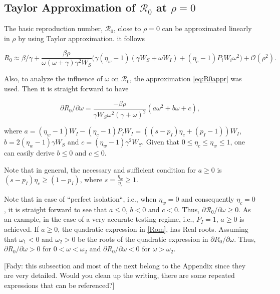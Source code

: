 \documentclass[12pt]{article}
\newcommand{\Rnum}{\mathcal{R}_0}
\theoremstyle{definition} %
\begin{document}
\subsection{Taylor Approximation of $\Rnum$ at $\rho=0$ }

The basic reproduction number, $\Rnum$, close to $\rho=0$ can be approximated linearly in $\rho$ by using Taylor approximation. it follows

\begin{equation}
\label{eq:R0appr}
R_0 \approx \beta/\gamma + \frac{\beta \rho}{\omega (\omega+\gamma) \gamma^2 W_S} \Big(\gamma(\eta_w-1)(\gamma W_S+\omega W_I) + (\eta_c -1)P_iW_i \omega^2 \Big) + \mathcal{O}(\rho^2).
\end{equation}

Also, to analyze the influence of $\omega$ on $\Rnum$, the approximation \eqref{eq:R0appr} was used. Then it is straight forward to have

\begin{equation}
\label{Rom}
\partial{R_0}/\partial{\omega}=  \frac{-\beta \rho}{\gamma W_S\omega^2 (\gamma+\omega)^2}  (a \omega^2 + b \omega + c),
\end{equation}

where $a=(\eta_w-1)W_I-(\eta_c-1)P_I W_I = ((s-p_I)\eta_c + (p_I-1)) W_I$, $b=2(\eta_w-1)\gamma W_S$ and $c=(\eta_w-1)\gamma^2 W_S$.
Given that $0 \leq \eta_c\leq \eta_w \leq 1 $, one can easily derive $b\leq 0$ and $c \leq 0$. 

Note that in general, the necessary and sufficient condition for $a \geq 0$ is $(s-p_I) \eta_c \geq (1-p_I)$, where $s=\frac{\eta_w}{\eta_c} \geq 1$. 

Note that in case of ``perfect isolation``, i.e., when $\eta_w=0$ and consequently $\eta_c=0$, it is straight forward to see that $a \leq 0$, $b<0$ and $c<0$. Thus, $\partial{\Rnum}/\partial{\omega} \geq 0$. 
As an example, in the case of a very accurate testing regime,  i.e., $P_I=1$, $a \geq 0$ is achieved. If $a\geq 0$, the quadratic expression in \eqref{Rom}, has Real roots. Assuming that $\omega_1<0$ and $\omega_2>0$ be the roots of the quadratic expression in $\partial{R_0}/\partial{\omega}$. Thus, $\partial{R_0}/\partial{\omega}>0$ for $0<\omega<\omega_2$ and  $\partial{R_0}/\partial{\omega}<0$ for $\omega>\omega_2$.

[Fady: this subsection and most of the next belong to the Appendix since they are very detailed. Would you clean up the writing, there are some repeated expressions that can be referenced?]
\end{document}
